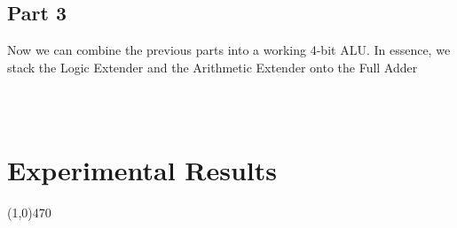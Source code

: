\documentclass[12pt]{article}
\begin{document}
	\subsection{Part 3}
		Now we can combine the previous parts into a working 4-bit ALU. In essence, we stack the Logic Extender and the Arithmetic Extender onto the Full Adder
\newpage
		\begin{Verbatim}[frame=single, fontsize=\small]

			
		\end{Verbatim}
			
\section{Experimental Results}\vspace{-.7cm} \line(1,0){470}

%
%
%
%
%
\end{document}
